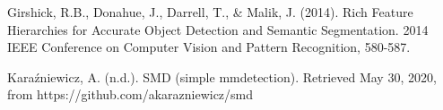 \begin{thebibliography}{9}

Girshick, R.B., Donahue, J., Darrell, T., \& Malik, J. (2014).
Rich Feature Hierarchies for Accurate Object Detection and Semantic Segmentation.
2014 IEEE Conference on Computer Vision and Pattern Recognition, 580-587.

Karaźniewicz, A. (n.d.).
SMD (simple mmdetection).
Retrieved May 30, 2020, from https://github.com/akarazniewicz/smd

\end{thebibliography}